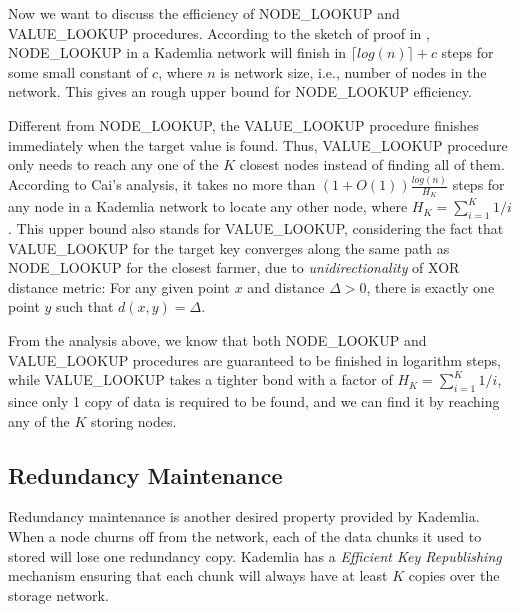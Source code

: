 \newpage

Now we want to discuss the efficiency of NODE\_LOOKUP and VALUE\_LOOKUP procedures. According to the sketch of proof in \cite{maymounkov2002kademlia}, NODE\_LOOKUP in a Kademlia network will finish in $\lceil log(n) \rceil + c$ steps for some small constant of $c$, where $n$ is network size, i.e., number of nodes in the network. This gives an rough upper bound for NODE\_LOOKUP efficiency.

Different from NODE\_LOOKUP, the VALUE\_LOOKUP procedure finishes immediately when the target value is found. Thus, VALUE\_LOOKUP procedure only needs to reach any one of the $K$ closest nodes instead of finding all of them. According to Cai's analysis\cite{cai2013probabilistic}, it takes no more than $(1+O(1))\frac{log(n)}{H_{K}}$ steps for any node in a Kademlia network to locate any other node, where $H_K = \sum_{i=1}^{K} 1/i$. This upper bound also stands for VALUE\_LOOKUP, considering the fact that VALUE\_LOOKUP for the target key converges along the same path as NODE\_LOOKUP for the closest farmer, due to \textit{unidirectionality} of XOR distance metric: For any given point $x$ and distance $\Delta>0$, there is exactly one point $y$ such that $d(x,y)=\Delta$.

From the analysis above, we know that both NODE\_LOOKUP and VALUE\_LOOKUP procedures are guaranteed to be finished in logarithm steps, while VALUE\_LOOKUP takes a tighter bond with a factor of $H_K = \sum_{i=1}^{K} 1/i$, since only 1 copy of data is required to be found, and we can find it by reaching any of the $K$ storing nodes.

\newpage

\subsection{Redundancy Maintenance}
\label{ss:redundancymaintenance}
Redundancy maintenance is another desired property provided by Kademlia. When a node churns off from the network, each of the data chunks it used to stored will lose one redundancy copy. Kademlia has a \textit{Efficient Key Republishing} mechanism ensuring that each chunk will always have at least $K$ copies over the storage network.

